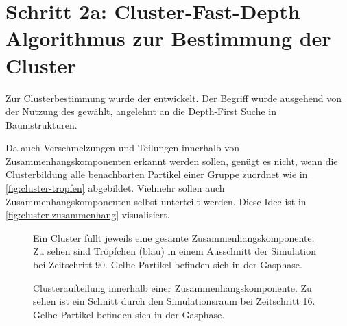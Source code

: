 \section{Schritt 2a: Cluster-Fast-Depth Algorithmus zur Bestimmung der Cluster}\label{sec:fast-depth}

Zur Clusterbestimmung wurde der \CFD entwickelt. Der Begriff wurde ausgehend von der Nutzung des  gewählt, angelehnt an die Depth-First Suche in Baumstrukturen.

Da auch Verschmelzungen und Teilungen innerhalb von Zusammenhangskomponenten erkannt werden sollen, genügt es nicht, wenn die Clusterbildung alle benachbarten Partikel einer Gruppe zuordnet wie in \autoref{fig:cluster-tropfen} abgebildet. Vielmehr sollen auch Zusammenhangskomponenten selbst unterteilt werden. Diese Idee ist in \autoref{fig:cluster-zusammenhang} visualisiert.

\begin{figure}
	{\caption{Ein Cluster füllt jeweils eine gesamte Zusammenhangskomponente. Zu sehen sind Tröpfchen (blau) in einem Ausschnitt der Simulation bei Zeitschritt 90. Gelbe Partikel befinden sich in der Gasphase.}\label{fig:cluster-tropfen}}
\end{figure}

\begin{figure}
	{\caption{Clusteraufteilung innerhalb einer Zusammenhangskomponente. Zu sehen ist ein Schnitt durch den Simulationsraum bei Zeitschritt 16. Gelbe Partikel befinden sich in der Gasphase.}\label{fig:cluster-zusammenhang}}
\end{figure}

